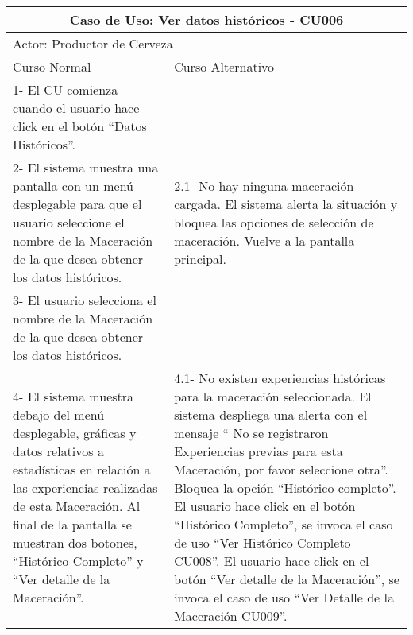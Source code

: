     
    \begin{minipage}{0.95\textwidth}
    \begin{center}
    \begin{tabularx}{\textwidth}{ | X | X |}
        \hline
        \multicolumn{2}{|c|}{\textbf{Caso de Uso: Ver datos históricos - CU006}} \\
        \hline
        \multicolumn{2}{|l|}{Actor: Productor de Cerveza} \\
        \hline
        Curso Normal & Curso Alternativo \\
        \hline
        1- El CU comienza cuando el usuario hace click en el botón “Datos Históricos”. & \\
        \hline
        2- El sistema muestra una pantalla con un menú desplegable para que el usuario seleccione el nombre de la Maceración de la que desea obtener los datos históricos. & 2.1- No hay ninguna maceración cargada. El sistema alerta la situación y bloquea las opciones de selección de maceración. Vuelve a la pantalla principal.\\
        \hline
        3- El usuario selecciona el nombre de la Maceración de la que desea obtener los datos históricos. &
        \\
        \hline
        4- El sistema muestra debajo del menú desplegable, gráficas y datos relativos a estadísticas en relación a las experiencias realizadas de esta Maceración. Al final de la pantalla se muestran dos botones, “Histórico Completo” y “Ver detalle de la Maceración”. & 4.1- No existen experiencias históricas para la maceración seleccionada. El sistema despliega una alerta con el mensaje “ No se registraron Experiencias previas para esta Maceración, por favor seleccione otra”. Bloquea la opción “Histórico completo”.\newline
        4.2- El usuario hace click en el botón “Histórico Completo”, se invoca el caso de uso “Ver Histórico Completo CU008”.\newline
        4.3-El usuario hace click en el botón “Ver detalle de la Maceración”, se invoca el caso de uso “Ver Detalle de la Maceración CU009”.
        \\
        \hline
    \end{tabularx}
    \label{CU006}
    \end{center}
    \end{minipage}
    
